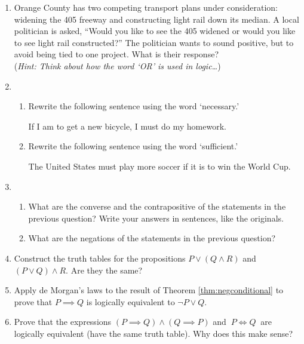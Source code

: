 \begin{exercises}{}{}
\begin{enumerate}
  \item Orange County has two competing transport plans under consideration: widening the 405 freeway and constructing light rail down its median. A local politician is asked, ``Would you like to see the 405 widened or would you like to see light rail constructed?'' The politician wants to sound positive, but to avoid being tied to one project. What is their response?\\
  (\emph{Hint: Think about how the word `OR' is used in logic\ldots})
  
  \item\begin{enumerate}
    \item Rewrite the following sentence using the word `necessary.'
  	\begin{center}
  		If I am to get a new bicycle, I must do my homework.
  	\end{center}
  
  	\item Rewrite the following sentence using the word `sufficient.'
  	\begin{center}
  		The United States must play more soccer if it is to win the World Cup.
  	\end{center}
  \end{enumerate}
  
  \item\begin{enumerate}
    \item What are the converse and the contrapositive of the statements in the previous question? Write your answers in sentences, like the originals.
  	\item What are the negations of the statements in the previous question?
  \end{enumerate} 
  
  \item Construct the truth tables for the propositions $P\vee(Q\wedge R)$ and $(P\vee Q)\wedge R$. Are they the same?
  
  \item\label{ex:demorganimplies} Apply de Morgan's laws to the result of Theorem \ref{thm:negconditional}  to prove that $P\implies Q$ is logically equivalent to $\neg P\vee Q$.

  \item Prove that the expressions $(P\implies Q)\wedge (Q\implies P)$ and $\ P\iff Q\ $ are logically equivalent (have the same truth table). Why does this make sense?
  

\end{enumerate}
\end{exercises}
